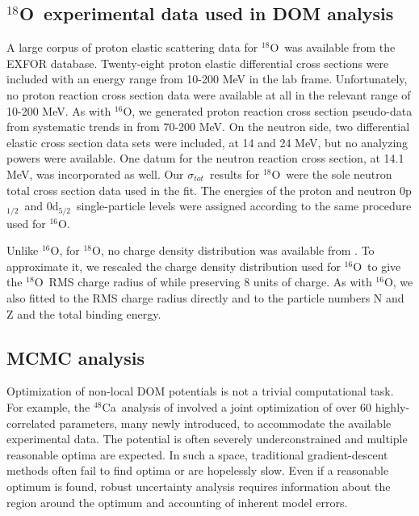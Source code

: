 \documentclass[twocolumn,secnumarabic,amssymb, nobibnotes, aps, prl,
superscriptaddress, nobalancelastpage]{revtex4}
\newcommand{\tot}{\ensuremath{\sigma_{tot}}}
\newcommand{\oSix}{\ensuremath{^{16}}O}
\newcommand{\oEight}{\ensuremath{^{18}}O}
\newcommand{\caEight}{\ensuremath{^{48}}C\lowercase{a}}
\newcommand{\pOne}{p\ensuremath{_{1/2}}}
\newcommand{\dFive}{d\ensuremath{_{5/2}}}
\begin{document}
\subsection{\oEight\ experimental data used in DOM analysis}
A large corpus of proton elastic scattering data for \oEight\ was
available from the EXFOR database. Twenty-eight proton elastic differential cross
sections were included with an energy range from 10-200 MeV in the lab frame.
Unfortunately, no proton reaction cross section data were available at all in
the relevant range of 10-200 MeV. As with \oSix, we generated proton reaction cross section pseudo-data from
systematic trends in \cite{Carlson1975} from 70-200 MeV. On the neutron side, two
differential elastic cross section data sets were included, at 14 and 24 MeV,
but no analyzing powers were available. One datum for the neutron reaction cross
section, at 14.1 MeV, was incorporated as well.
Our \tot\ results for \oEight\ were the
sole neutron total cross section data used in the fit. The energies of the
proton and neutron 0\pOne\ and 0\dFive\ single-particle
levels were assigned according to the same procedure used for \oSix.

Unlike \oSix, for \oEight, no charge density distribution was available from
\cite{DeVries1987}. To approximate it, we rescaled the charge density
distribution used for \oSix\ to give the \oEight\ RMS charge radius of
\cite{Angeli2013} while preserving 8 units of charge.
As with \oSix, we also fitted to the
RMS charge radius directly and to the particle numbers N and Z and the
total binding energy.

\subsection{MCMC analysis}
Optimization of non-local DOM potentials is not a trivial computational task.
For example, the \caEight\ analysis of \cite{Mahzoon2017} involved a joint
optimization of over 60 highly-correlated parameters, many newly introduced, to
accommodate the available experimental data. The potential is
often severely underconstrained and multiple reasonable optima are expected.
In such a space, traditional gradient-descent methods often fail to find optima
or are hopelessly slow. Even if a reasonable optimum is found, robust
uncertainty analysis requires information about the region around the optimum and
accounting of inherent model errors.
\end{document}

